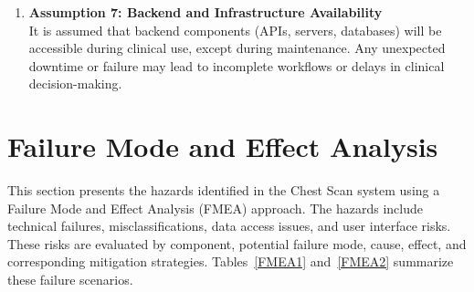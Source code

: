 \documentclass{article}
\begin{document}
\begin{enumerate}
  \item \textbf{Assumption 7: Backend and Infrastructure Availability} \\
    It is assumed that backend components (APIs, servers, databases) will be accessible during clinical use, except during maintenance. Any unexpected downtime or failure may lead to incomplete workflows or delays in clinical decision-making.
\end{enumerate}


\section{Failure Mode and Effect Analysis}


This section presents the hazards identified in the Chest Scan system using a Failure Mode and Effect Analysis (FMEA) approach. The hazards include technical failures, misclassifications, data access issues, and user interface risks. These risks are evaluated by component, potential failure mode, cause, effect, and corresponding mitigation strategies. Tables~\ref{FMEA1} and~\ref{FMEA2} summarize these failure scenarios.
\end{document}
